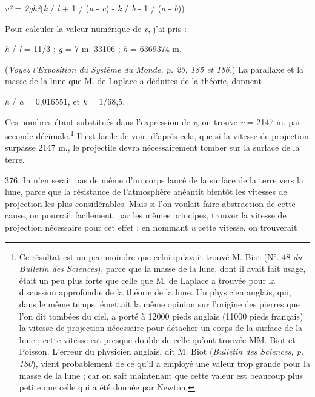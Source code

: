 \documentclass[a4paper, 11pt, oneside, polutonikogreek, french]{article}
\begin{document}
\emph{v²} = \emph{2gh²}(\emph{k} / \emph{l} + 1 / (\emph{a} - \emph{c}) - \emph{k} / \emph{b} - 1 / (\emph{a} - \emph{b}))



Pour calculer la valeur numérique de \emph{v}, j'ai pris :

\emph{h} / \emph{l} = 11/3 ; \emph{g} = 7 m. 33106 ; \emph{h} = 6369374 m.

(\emph{Voyez l'Exposition du Système du Monde, p. 23, 185 et 186.}) La parallaxe et la masse de la lune que M. de Laplace a déduites de la théorie, donnent

\emph{h} / \emph{a} = 0,016551, et \emph{k} = 1/68,5.

Ces nombres étant substitués dans l'expression de \emph{v}, on trouve \emph{v} = 2147 m. par seconde décimale.\footnote{Ce résultat est un peu moindre que celui qu'avait trouvé M. Biot (N°. 48 \emph{du Bulletin des Sciences}), parce que la masse de la lune, dont il avait fait usage, était un peu plus forte que celle que M. de Laplace a trouvée pour la discussion approfondie de la théorie de la lune. Un physicien anglais, qui, dans le même temps, émettait la même opinion sur l'origine des pierres que l'on dit tombées du ciel, a porté à 12000 pieds anglais (11000 pieds français) la vitesse de projection nécessaire pour détacher un corps de la surface de la lune ; cette vitesse est presque double de celle qu'ont trouvée MM. Biot et Poisson. L'erreur du physicien anglais, dit M. Biot (\emph{Bulletin des Sciences, p. 180}), vient probablement de ce qu'il a employé une valeur trop grande pour la masse de la lune ; car on sait maintenant que cette valeur est beaucoup plus petite que celle qui a été donnée par Newton.} Il est facile de voir, d'après cela, que si la vitesse de projection surpasse 2147 m., le projectile devra nécessairement tomber sur la surface de la terre.

376. In n'en serait pas de même d'un corps lancé de la surface de la terre vers la lune, parce que la résistance de l'atmosphère anéantit bientôt les vitesses de projection les plus considérables. Mais si l'on voulait faire abstraction de cette cause, on pourrait facilement, par les mêmes principes, trouver la vitesse de projection nécessaire pour cet effet ; en nommant \emph{u} cette vitesse, on trouverait
\end{document}
